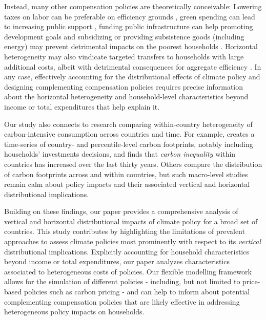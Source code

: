 \documentclass[12pt, a4paper]{article}
\begin{document}
Instead, many other compensation policies are theoretically conceivable: Lowering taxes on labor can be preferable on efficiency grounds \autocite{Pearce.1991,Goulder.1995,Bento.2018}, green spending can lead to increasing public support \autocite{Sommer.2022,Kotchen.2017,Dechezlepretre.2022}, funding public infrastructure can help promoting development goals \autocite{Franks.2018,Jakob.2016} and subsidizing or providing subsistence goods (including energy) may prevent detrimental impacts on the poorest households \autocite{Greve.2022,Schaffitzel.2019}. Horizontal heterogeneity may also vindicate targeted transfers to households with large additional costs, albeit with detrimental consequences for aggregate efficiency \autocite{Hansel.2022}. In any case, effectively accounting for the distributional effects of climate policy and designing complementing compensation policies requires precise information about the horizontal heterogeneity and household-level characteristics beyond income or total expenditures that help explain it. %

Our study also connects to research comparing within-country heterogeneity of carbon-intensive consumption across countries and time. For example, \textcite{Chancel.2022b} creates a time-series of country- and percentile-level carbon footprints, notably including households' investments decisions, and finds that \textit{carbon inequality} within countries has increased over the last thirty years. Others \autocite{Oswald.2020,Bruckner.2022} compare the distribution of carbon footprints across and within countries, but such macro-level studies remain calm about policy impacts and their associated vertical and horizontal distributional implications.

Building on these findings, our paper provides a comprehensive analysis of vertical and horizontal distributional impacts of climate policy for a broad set of countries. This study contributes by highlighting the limitations of prevalent approaches to assess climate policies most prominently with respect to its \textit{vertical} distributional implications. Explicitly accounting for household characteristics beyond income or total expenditures, our paper analyzes characteristics associated to heterogeneous costs of policies. Our flexible modelling framework allows for the simulation of different policies - including, but not limited to price-based policies such as carbon pricing - and can help to inform about potential complementing compensation policies that are likely effective in addressing heterogeneous policy impacts on households.
\end{document}

